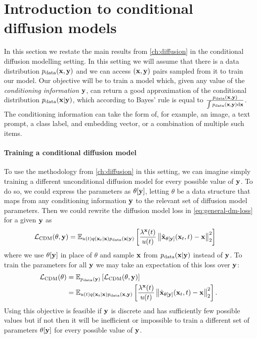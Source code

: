 \section{Introduction to conditional diffusion models} \label{sec:conditional-diffusion-overview}

In this section we restate the main results from \cref{ch:diffusion} in the conditional diffusion modelling setting. In this setting we will assume that there is a data distribution $p_\text{data}({\mathbf{x}}, {\mathbf{y}})$ and we can access $({\mathbf{x}}, {\mathbf{y}})$ pairs sampled from it to train our model. Our objective will be to train a model which, given any value of the \textit{conditioning information} ${\mathbf{y}}$, can return a good approximation of the conditional distribution $p_\text{data}({\mathbf{x}}|{\mathbf{y}})$, which according to Bayes' rule is equal to $\frac{p_\text{data}({\mathbf{x}},{\mathbf{y}})}{\int p_\text{data}({\mathbf{x}},{\mathbf{y}}) \mathrm{d}{\mathbf{x}}}$. The conditioning information can take the form of, for example, an image, a text prompt, a class label, and embedding vector, or a combination of multiple such items.

\paragraph{Training a conditional diffusion model}
To use the methodology from \cref{ch:diffusion} in this setting, we can imagine simply training a different unconditional diffusion model for every possible value of ${\mathbf{y}}$. To do so, we could express the parameters as $\theta[{\mathbf{y}}]$, letting $\theta$ be a data structure that maps from any conditioning information ${\mathbf{y}}$ to the relevant set of diffusion model parameters. Then we could rewrite the diffusion model loss in \cref{eq:general-dm-loss} for a given ${\mathbf{y}}$ as
\begin{align} \label{eq:cond-diffusion-loss-single-y}
    {\mathcal{L}}_\text{CDM}(\theta, {\mathbf{y}}) &= \mathbb{E}_{u(t)q({\mathbf{x}}_t|{\mathbf{x}})p_{\rm{data}}({\mathbf{x}}|{\mathbf{y}})} \left[ \frac{\lambda^{\mathbf{x}}(t)}{u(t)} 
    \left\| \hat{{\mathbf{x}}}_{\theta[{\mathbf{y}}]}({\mathbf{x}}_t, t) - {\mathbf{x}} \right\|_2^2 \right]
\end{align}
where we use $\theta[{\mathbf{y}}]$ in place of $\theta$ and sample ${\mathbf{x}}$ from $p_{\rm{data}}({\mathbf{x}}|{\mathbf{y}})$ instead of ${\mathbf{y}}$. To train the parameters for all ${\mathbf{y}}$ we may take an expectation of this loss over ${\mathbf{y}}$:
\begin{align} \label{eq:cond-exp-diffusion-loss-all-sigma}
    {\mathcal{L}}_\text{CDM}(\theta) &= \mathbb{E}_{p_{\rm{data}}({\mathbf{y}})} \left[ {\mathcal{L}}_\text{CDM}(\theta, {\mathbf{y}}) \right] \\
    &= \mathbb{E}_{u(t)q({\mathbf{x}}_t|{\mathbf{x}})p_{\rm{data}}({\mathbf{x}}, {\mathbf{y}})} \left[ \frac{\lambda^{\mathbf{x}}(t)}{u(t)} 
    \left\| \hat{{\mathbf{x}}}_{\theta[{\mathbf{y}}]}({\mathbf{x}}_t, t) - {\mathbf{x}} \right\|_2^2 \right].
\end{align}
Using this objective is feasible if ${\mathbf{y}}$ is discrete and has sufficiently few possible values but if not then it will be inefficient or impossible to train a different set of parameters $\theta[{\mathbf{y}}]$ for every possible value of ${\mathbf{y}}$.

